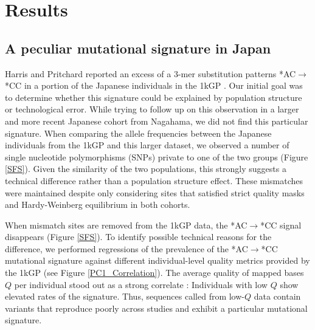 \documentclass[9pt,article]{template}
\begin{document}
\section{Results}

			
\subsection{A peculiar mutational signature in Japan}			
	
Harris and Pritchard reported an excess of a 3-mer substitution patterns *AC${\rightarrow}$*CC in a portion of the Japanese individuals in the 1kGP \citep{Harris2017a}.
Our initial goal was to determine whether this signature could be explained by population structure or technological error.
While trying to follow up on this observation in a larger and more recent Japanese cohort from Nagahama, we did not find this particular signature.
When comparing the allele frequencies between the Japanese individuals from the 1kGP and this larger dataset, we observed a number of single nucleotide polymorphisms (SNPs) private to one of the two groups (Figure \ref{SFS}).
Given the similarity of the two populations, this strongly suggests a technical difference rather than a population structure effect.
These mismatches were maintained despite only considering sites that satisfied strict quality masks and Hardy-Weinberg equilibrium in both cohorts.

When mismatch sites are removed from the 1kGP data, the  *AC${\rightarrow}$*CC signal disappears (Figure \ref{SFS}). To identify possible technical reasons for the difference, we performed regressions of the prevalence of the  *AC${\rightarrow}$*CC mutational signature against different individual-level quality metrics provided by the 1kGP (see Figure \ref{PC1_Correlation}). 
The average quality of mapped bases  $Q$ per individual stood out as a strong correlate : Individuals with low $Q$ show elevated rates of the signature. 
Thus, sequences called from low-$Q$ data contain variants that reproduce poorly across studies and exhibit a particular mutational signature. 
\end{document}
